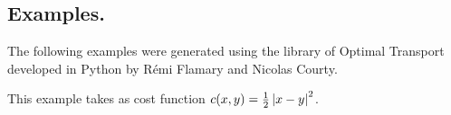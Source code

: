 \subsection{Examples.}

The following examples were generated using the library of Optimal Transport \cite{flamary2017pot} developed in Python by R\'emi Flamary and Nicolas Courty. 

This example takes as cost function $c(x,y)=\frac{1}{2}\left| x-y \right|^2$. 